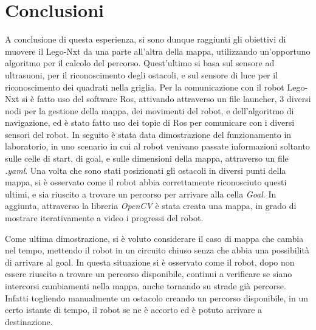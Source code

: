 \documentclass[english]{article}
\begin{document}
\section{Conclusioni}
A conclusione di questa esperienza, si sono dunque raggiunti gli obiettivi di muovere il Lego-Nxt da una parte all'altra della mappa, utilizzando un'opportuno algoritmo per il calcolo del percorso. Quest'ultimo si basa sul sensore ad ultrasuoni, per il riconoscimento degli ostacoli, e sul sensore di luce per il riconoscimento dei quadrati nella griglia. Per la comunicazione con il robot Lego-Nxt si è fatto uso del software Ros, attivando attraverso un file launcher, 3 diversi nodi per la gestione della mappa, dei movimenti del robot, e dell'algoritmo di navigazione, ed è stato fatto uso dei topic di Ros per comunicare con i diversi sensori del robot. In seguito è stata data dimostrazione del funzionamento in laboratorio, in uno scenario in cui al robot venivano passate informazioni soltanto sulle celle di start, di goal, e sulle dimensioni della mappa, attraverso un file \textit{.yaml}. Una volta che sono stati posizionati gli ostacoli in diversi punti della mappa, si è osservato come il robot abbia correttamente riconosciuto questi ultimi, e sia riuscito a trovare un percorso per arrivare alla cella \textit{Goal}. In aggiunta, attraverso la libreria \textit{OpenCV} è stata creata una mappa, in grado di mostrare iterativamente a video i progressi del robot. 

Come ultima dimostrazione, si è voluto considerare il caso di mappa che cambia nel tempo, mettendo il robot in un circuito chiuso senza che abbia una possibilità di arrivare al goal. In questa situazione si è osservato come il robot, dopo non essere riuscito a trovare un percorso disponibile, continui a verificare se siano intercorsi cambiamenti nella mappa, anche tornando su strade già percorse. Infatti togliendo manualmente un ostacolo creando un percorso disponibile, in un certo istante di tempo, il robot se ne è accorto ed è potuto arrivare a destinazione. 


\clearpage
\end{document}
